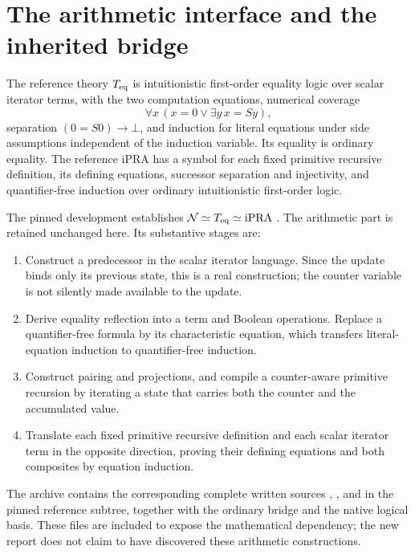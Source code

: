 \section{The arithmetic interface and the inherited bridge}
\label{app:arithmetic-bridge}

The reference theory $T_{\mathrm{eq}}$ is intuitionistic first-order equality logic
over scalar iterator terms, with the two computation equations,
numerical coverage
\[
\forall x\,(x=0\vee\exists y\,x=Sy),
\]
separation $(0=S0)\to\bot$, and induction for literal equations under
side assumptions independent of the induction variable. Its equality
is ordinary equality. The reference iPRA has a symbol for each fixed
primitive recursive definition, its defining equations, successor
separation and injectivity, and quantifier-free induction over ordinary
intuitionistic first-order logic.

The pinned development establishes $\mathcal N\simeq T_{\mathrm{eq}}\simeq\mathrm{iPRA}$
\cite{bridge}. The arithmetic part is retained unchanged here. Its
substantive stages are:
\begin{enumerate}
\item Construct a predecessor in the scalar iterator language. Since the
update binds only its previous state, this is a real construction; the
counter variable is not silently made available to the update.
\item Derive equality reflection into a term and Boolean operations.
Replace a quantifier-free formula by its characteristic equation, which
transfers literal-equation induction to quantifier-free induction.
\item Construct pairing and projections, and compile a counter-aware
primitive recursion by iterating a state that carries both the counter
and the accumulated value.
\item Translate each fixed primitive recursive definition and each
scalar iterator term in the opposite direction, proving their defining
equations and both composites by equation induction.
\end{enumerate}

The archive contains the corresponding complete written sources
, , and
 in the pinned reference subtree, together
with the ordinary bridge and the native logical basis. These files are
included to expose the mathematical dependency; the new report does
not claim to have discovered these arithmetic constructions.

